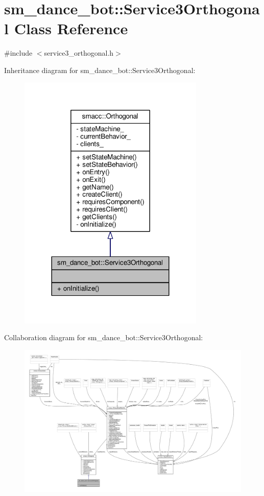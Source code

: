 \hypertarget{classsm__dance__bot_1_1Service3Orthogonal}{}\section{sm\+\_\+dance\+\_\+bot\+:\+:Service3\+Orthogonal Class Reference}
\label{classsm__dance__bot_1_1Service3Orthogonal}


{\ttfamily \#include $<$service3\+\_\+orthogonal.\+h$>$}



Inheritance diagram for sm\+\_\+dance\+\_\+bot\+:\+:Service3\+Orthogonal\+:
\nopagebreak
\begin{figure}[H]
\begin{center}
\leavevmode
\includegraphics[width=252pt]{classsm__dance__bot_1_1Service3Orthogonal__inherit__graph}
\end{center}
\end{figure}


Collaboration diagram for sm\+\_\+dance\+\_\+bot\+:\+:Service3\+Orthogonal\+:
\nopagebreak
\begin{figure}[H]
\begin{center}
\leavevmode
\includegraphics[width=350pt]{classsm__dance__bot_1_1Service3Orthogonal__coll__graph}
\end{center}
\end{figure}
